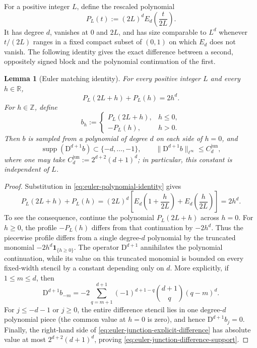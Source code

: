 \documentclass[11pt]{amsart}
\theoremstyle{plain}
\newtheorem{lemma}[theorem]{Lemma}
\theoremstyle{definition}
\theoremstyle{remark}
\numberwithin{equation}{section}
\theoremstyle{plain}
\begin{document}
For a positive integer $L$, define the rescaled polynomial
\begin{equation}\label{eq:scaled-euler-polynomial}
	P_L(t):=(2L)^dE_d\!\left(\frac{t}{2L}\right).
\end{equation}
It has degree $d$, vanishes at $0$ and $2L$, and has size comparable to
$L^d$ whenever $t/(2L)$ ranges in a fixed compact subset of $(0,1)$ on which
$E_d$ does not vanish.  The following identity gives the exact difference
between a second, oppositely signed block and the polynomial continuation of
the first.

\begin{lemma}[Euler matching identity]
	\label{lem:euler-junction}
	For every positive integer $L$ and every $h\in\mathbb R$,
	\begin{equation}\label{eq:euler-junction}
		P_L(2L+h)+P_L(h)=2h^d.
	\end{equation}
	For $h\in\mathbb Z$, define
	\[
		b_h:=
		\begin{cases}
			P_L(2L+h),&h\le0,\\
			-P_L(h),&h>0.
		\end{cases}
	\]
	Then $b$ is sampled from a polynomial of degree $d$ on each side of $h=0$,
	and
	\begin{equation}\label{eq:euler-junction-difference-support}
		\operatorname{supp}(\mathrm D^{d+1}b)
		\subset\{-d,\ldots,-1\},
		\qquad
		\|\mathrm D^{d+1}b\|_{\ell^\infty}
		\le C_d^{\mathrm{jun}},
	\end{equation}
	where one may take
	$C_d^{\mathrm{jun}}:=2^{d+2}(d+1)^d$; in particular, this constant is
	independent of $L$.
\end{lemma}

\begin{proof}
	Substitution in \eqref{eq:euler-polynomial-identity} gives
	\[
	P_L(2L+h)+P_L(h)
	=(2L)^d\left[
	E_d\!\left(1+\frac{h}{2L}\right)
	+E_d\!\left(\frac{h}{2L}\right)
	\right]
	=2h^d.
	\]
	To see the consequence, continue the polynomial $P_L(2L+h)$ across
	$h=0$.
	For $h\ge0$, the profile $-P_L(h)$ differs from that
	continuation by $-2h^d$.  Thus the piecewise profile differs from a single
	degree-$d$ polynomial by the truncated monomial
	$-2h^d\mathbf 1_{\{h\ge0\}}$.  The operator $\mathrm D^{d+1}$ annihilates
	the polynomial continuation, while its value on this truncated monomial is
	bounded on every fixed-width stencil by a constant depending only on $d$.
	More explicitly, if $1\le m\le d$, then
	\begin{equation}\label{eq:euler-junction-explicit-difference}
		\mathrm D^{d+1}b_{-m}
		=-2\sum_{q=m+1}^{d+1}(-1)^{d+1-q}
		\binom{d+1}{q}(q-m)^d.
	\end{equation}
	For $j\le-d-1$ or $j\ge0$, the entire difference stencil lies in one
	degree-$d$ polynomial piece (the common value at $h=0$ is zero), and hence
	$\mathrm D^{d+1}b_j=0$.  Finally, the right-hand side of
	\eqref{eq:euler-junction-explicit-difference} has absolute value at most
	$2^{d+2}(d+1)^d$, proving
	\eqref{eq:euler-junction-difference-support}.
\end{proof}
\end{document}
